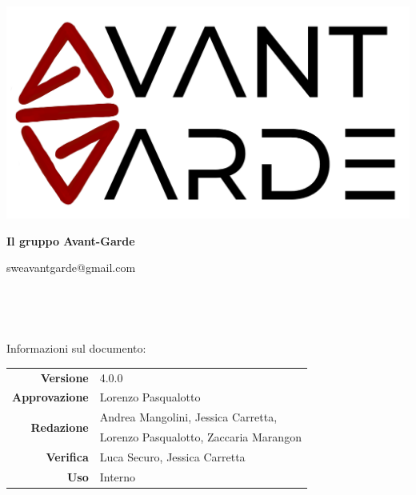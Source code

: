     \begin{titlepage}
        \begin{center}
            \includegraphics[width=\textwidth]{logo+scritta.png}

            \vspace{0.5cm}
            {\huge \textbf{Il gruppo Avant-Garde}}

            \vspace{0.4cm}
            \large{sweavantgarde@gmail.com}

            \vspace{1.5cm}
            \hrulefill\\
            \vspace{0.2cm}
            
            \textbf{\titoloDocumento}\\
           
            \hrulefill

            \vfill
            Informazioni sul documento:\\
            \vspace{0.3cm}
                \begin{tabular}{ r | l }
                    \textbf{Versione} & 4.0.0\\ %
                    \textbf{Approvazione} & Lorenzo Pasqualotto\\ %
                    \multirow{2}{*}{\textbf{Redazione}} & Andrea Mangolini, Jessica Carretta, \\ & Lorenzo Pasqualotto, Zaccaria Marangon\\ %
                    \textbf{Verifica} & Luca Securo, Jessica Carretta\\ %
                    \textbf{Uso} & Interno\\ %
                \end{tabular}
        \end{center}
    \end{titlepage}
\restoregeometry